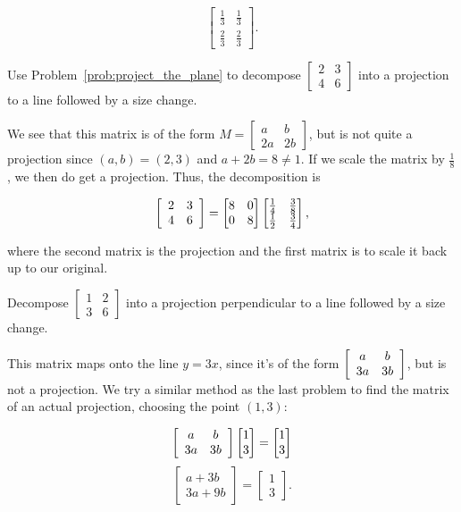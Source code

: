 \documentclass[../key.tex]{subfiles}
\begin{document}
$$\begin{bmatrix}
\frac{1}{3} & \frac{1}{3} \\
\frac{2}{3} & \frac{2}{3}
\end{bmatrix}.$$

\begin{outer_problem}
\item Use Problem~\ref{prob:project_the_plane} to decompose $\left[\begin{smallmatrix} 2 & 3 \\ 4 & 6 \end{smallmatrix}\right]$ into a projection to a line followed by a size change.
\end{outer_problem}

We see that this matrix is of the form $M=\left[\begin{smallmatrix} a & b \\ 2a & 2b\end{smallmatrix}\right]$, but is not quite a projection since $(a,b)=(2,3)$ and $a+2b=8\neq 1$. If we scale the matrix by $\frac{1}{8}$, we then do get a projection. Thus, the decomposition is

    $$\left[\begin{array}{cc} 2 & 3 \\ 4 & 6 \end{array}\right] = \begin{bmatrix}8 & 0 \\ 0 & 8 \end{bmatrix} \begin{bmatrix}
    \frac{1}{4} & \frac{3}{8} \\
    \frac{1}{2} & \frac{3}{4}
\end{bmatrix},$$

where the second matrix is the projection and the first matrix is to scale it back up to our original.

\begin{outer_problem}
\item Decompose $\left[\begin{smallmatrix} 1 & 2 \\ 3 & 6\end{smallmatrix}\right]$ into a projection perpendicular to a line followed by a size change.
\end{outer_problem}

This matrix maps onto the line $y=3x$, since it's of the form $\left[\begin{array}{cc} a & b \\ 3a & 3b \end{array}\right]$, but is not a projection. We try a similar method as the last problem to find the matrix of an actual projection, choosing the point $(1,3)$:

$$\left[\begin{array}{cc} a & b \\ 3a & 3b \end{array}\right]\begin{bmatrix} 1 \\ 3 \end{bmatrix} = \begin{bmatrix} 1 \\ 3 \end{bmatrix}$$
$$\begin{bmatrix} a + 3b \\ 3a + 9b \end{bmatrix} = \begin{bmatrix} 1 \\ 3 \end{bmatrix}.$$
\end{document}
